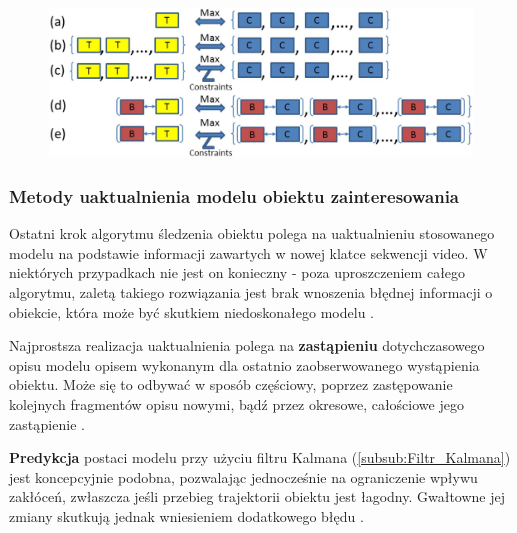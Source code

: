 \begin{figure}[!htb]
	\begin{center}
		\includegraphics[width=12cm]{images/target_tracking_methods.png}
	\end{center}	
\label{fig:Metody_sledzenia_obiektow_na_obrazach}
\end{figure}

\subsubsection{Metody uaktualnienia modelu obiektu zainteresowania}
\label{subsubsec:Metody_uaktualnienia_modelu_obiektu_zainteresowania}

Ostatni krok algorytmu śledzenia obiektu polega na uaktualnieniu stosowanego modelu na podstawie informacji zawartych w nowej klatce sekwencji video. W niektórych przypadkach nie jest on konieczny - poza uproszczeniem całego algorytmu, zaletą takiego rozwiązania jest brak wnoszenia błędnej informacji o obiekcie, która może być skutkiem niedoskonałego modelu \cite{Smeulders2010}.

Najprostsza realizacja uaktualnienia polega na \textbf{zastąpieniu} dotychczasowego opisu modelu opisem wykonanym dla ostatnio zaobserwowanego wystąpienia obiektu. Może się to odbywać w sposób częściowy, poprzez zastępowanie kolejnych fragmentów opisu nowymi, bądź przez okresowe, całościowe jego zastąpienie \cite{Smeulders2010}. 

\textbf{Predykcja} postaci modelu przy użyciu filtru Kalmana (\ref{subsub:Filtr_Kalmana}) jest koncepcyjnie podobna, pozwalając jednocześnie na ograniczenie wpływu zakłóceń, zwłaszcza jeśli przebieg trajektorii obiektu jest łagodny. Gwałtowne jej zmiany skutkują jednak wniesieniem dodatkowego błędu \cite{Smeulders2010}. 

